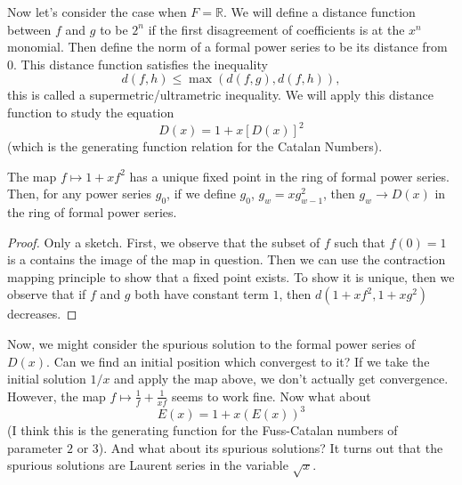 Now let's consider the case when $F = \mathbb{R}$. We will define a distance function between $f$ and $g$ to be $2^n$ if the first disagreement of coefficients is at the $x^n$ monomial. Then define the norm of a formal power series to be its distance from $0$. This distance function satisfies the inequality
\[d(f, h) \leq \max(d(f, g), d(f, h)),\]
this is called a supermetric/ultrametric inequality. We will apply this distance function to study the equation
\[D(x) = 1 + x[D(x)]^2\] (which is the generating function relation for the Catalan Numbers).
\begin{theorem}
The map $f \mapsto 1 + xf^2$ has a unique fixed point in the ring of formal power series. Then, for any power series $g_0$, if we define $g_0$,  $g_w = xg_{w-1}^2$, then $g_w \to D(x)$ in the ring of formal power series.
\end{theorem}

\begin{proof}
Only a sketch. First, we observe that the subset of $f$ such that $f(0) = 1$ is a contains the image of the map in question. Then we can use the contraction mapping principle to show that a fixed point exists. To show it is unique, then we observe that if $f$ and $g$ both have constant term $1$, then $d(1 + xf^2, 1 + xg^2)$ decreases.
\end{proof}

Now, we might consider the spurious solution to the formal power series of $D(x)$. Can we find an initial position which convergest to it? If we take the initial solution $1/x$ and apply the map above, we don't actually get convergence. However, the map $f \mapsto \frac{1}{f} + \frac{1}{xf}$ seems to work fine. Now what about 
\[E(x) = 1 + x(E(x))^3\]
(I think this is the generating function for the Fuss-Catalan numbers of parameter $2$ or $3$). And what about its spurious solutions? It turns out that the spurious solutions are Laurent series in the variable $\sqrt{x}$.
